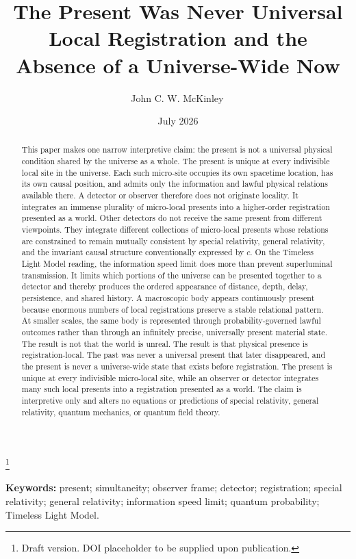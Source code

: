 \documentclass[12pt,onecolumn]{article}
\title{\textbf{The Present Was Never Universal}\\
\large Local Registration and the Absence of a Universe-Wide Now}
\author{John C. W. McKinley\,\orcidlink{0009-0005-7097-5035}}
\date{July 2026}
\newcommand\blfootnote[1]{%
  \begingroup
  \renewcommand\thefootnote{}\footnote{#1}%
  \addtocounter{footnote}{-1}%
  \endgroup
}
\begin{document}
\maketitle

\blfootnote{\scriptsize Draft version. DOI placeholder to be supplied upon publication.}

\begin{abstract}
This paper makes one narrow interpretive claim: the present is not a universal physical condition shared by the universe as a whole. The present is unique at every indivisible local site in the universe. Each such micro-site occupies its own spacetime location, has its own causal position, and admits only the information and lawful physical relations available there. A detector or observer therefore does not originate locality. It integrates an immense plurality of micro-local presents into a higher-order registration presented as a world. Other detectors do not receive the same present from different viewpoints. They integrate different collections of micro-local presents whose relations are constrained to remain mutually consistent by special relativity, general relativity, and the invariant causal structure conventionally expressed by \(c\). On the Timeless Light Model reading, the information speed limit does more than prevent superluminal transmission. It limits which portions of the universe can be presented together to a detector and thereby produces the ordered appearance of distance, depth, delay, persistence, and shared history. A macroscopic body appears continuously present because enormous numbers of local registrations preserve a stable relational pattern. At smaller scales, the same body is represented through probability-governed lawful outcomes rather than through an infinitely precise, universally present material state. The result is not that the world is unreal. The result is that physical presence is registration-local. The past was never a universal present that later disappeared, and the present is never a universe-wide state that exists before registration. The present is unique at every indivisible micro-local site, while an observer or detector integrates many such local presents into a registration presented as a world. The claim is interpretive only and alters no equations or predictions of special relativity, general relativity, quantum mechanics, or quantum field theory.
\end{abstract}

\noindent\textbf{Keywords:} present; simultaneity; observer frame; detector; registration; special relativity; general relativity; information speed limit; quantum probability; Timeless Light Model.
\end{document}
